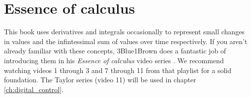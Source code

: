 \section{Essence of calculus}

This book uses derivatives and integrals occasionally to represent small changes
in values and the infintessimal sum of values over time respectively. If you
aren't already familiar with these concepts, 3Blue1Brown does a fantastic job of
introducing them in his \textit{Essence of calculus} video series
\cite{bib:essence_of_calculus}. We recommend watching videos 1 through 3 and 7
through 11 from that playlist for a solid foundation. The Taylor series (video
11) will be used in chapter \ref{ch:digital_control}.
